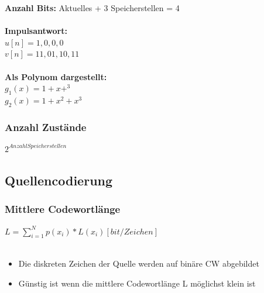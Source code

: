 \textbf{Anzahl Bits:} Aktuelles + 3 Speicherstellen = 4 \\
\\
\textbf{Impulsantwort:} \\
$u[n]=1,0,0,0$ \\
$v[n]=11,01,10,11$ \\
\\
\textbf{Als Polynom dargestellt:} \\
$g_1(x)=1+x+^3$ \\
$g_2(x)=1+x^2+x^3$

\subsubsection{Anzahl Zustände}
$2^{AnzahlSpeicherstellen}$\\
\clearpage

\subsection{Quellencodierung}
\subsubsection{Mittlere Codewortlänge}
$L=\sum_{i=1}^Np(x_i)*L(x_i)[bit/Zeichen]$ \\
\\
\begin{itemize}
	\item Die diskreten Zeichen der Quelle werden auf binäre CW abgebildet
	\item Günstig ist wenn die mittlere Codewortlänge L möglichst klein ist
\end{itemize}

